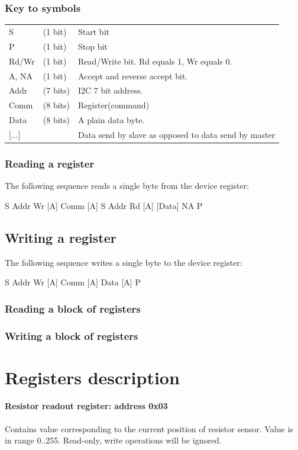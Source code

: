 \documentclass{article}
\begin{document}
\subsubsection{Key to symbols}
\begin{tabular}{lll}
  S    & (1 bit) & Start bit\\
  P    & (1 bit) & Stop bit\\
  Rd/Wr & (1 bit) & Read/Write bit. Rd equals 1, Wr equals 0.\\
  A, NA & (1 bit) & Accept and reverse accept bit. \\
  Addr  & (7 bits)& I2C 7 bit address.\\
  Comm  & (8 bits)& Register(command) \\
  Data  & (8 bits)& A plain data byte. \\
  $[$...$]$  &         & Data send by slave as opposed to data send by master
\end{tabular}

\subsubsection{Reading a register}
The following sequence reads a single byte from the device register:

S Addr Wr [A] Comm [A] S Addr Rd [A] [Data] NA P

\subsection{Writing a register}
The following sequence writes a single byte to the device register:

S Addr Wr [A] Comm [A] Data [A] P

\subsubsection{Reading a block of registers}

\subsubsection{Writing a block of registers}


\section{Registers description}

\paragraph{Resistor readout register: address 0x03}
Contains value corresponding to the current position of resistor sensor. Value is in range 0..255. Read-only, write operations will be ignored.
\end{document}
